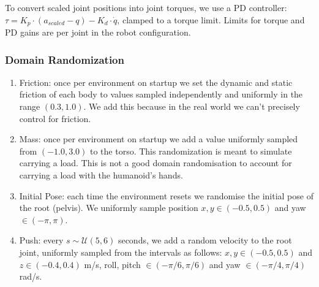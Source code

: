 \documentclass[11pt]{article}
\begin{document}
To convert scaled joint positions into joint torques, we use a PD controller: $\tau = K_p \cdot (a_{scaled} - q) - K_d \cdot \dot q$, clamped to a torque limit. Limits for torque and PD gains are per joint in the robot configuration.

\subsubsection*{Domain Randomization}
\begin{enumerate}
    \item Friction: once per environment on startup we set the dynamic and static friction of each body to values sampled independently and uniformly in the range $(0.3, 1.0)$. We add this because in the real world we can't precisely control for friction.
    \item Mass: once per environment on startup we add a value uniformly sampled from $(-1.0, 3.0)$ to the torso. This randomization is meant to simulate carrying a load. This is not a good domain randomisation to account for carrying a load with the humanoid's hands.
    \item Initial Pose: each time the environment resets we randomise the initial pose of the root (pelvis). We uniformly sample position $x,y \in (-0.5, 0.5)$ and yaw $\in (-\pi, \pi)$.
    \item Push: every $s \sim \mathcal{U}(5, 6)$ seconds, we add a random velocity to the root joint, uniformly sampled from the intervals as follows: $x,y\in (-0.5, 0.5)$ and $z\in (-0.4, 0.4)$ m/s, roll, pitch $\in (-\pi/6, \pi/6)$ and yaw $\in (-\pi/4, \pi/4)$ rad/s.
\end{enumerate}
\end{document}
